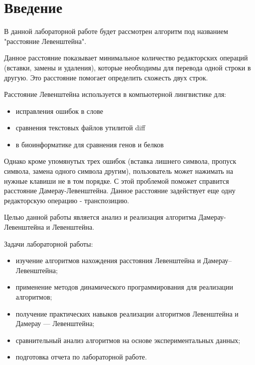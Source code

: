 \chapter*{Введение}

В данной лабораторной работе будет рассмотрен алгоритм под названием "расстояние Левенштейна". 

Данное расстояние показывает минимальное количество редакторских операций (вставки, замены и удаления), которые необходимы для перевода одной строки в другую. Это расстояние помогает определить схожесть двух строк.  

Расстояние Левенштейна используется в компьютерной лингвистике для:
\begin{itemize}
	\item исправления ошибок в слове
	\item сравнения текстовых файлов утилитой diff
	\item в биоинформатике для сравнения генов и белков
\end{itemize}

Однако кроме упомянутых трех ошибок (вставка лишнего символа, пропуск символа, замена одного символа другим), пользователь может нажимать на нужные клавиши не в том порядке. С этой проблемой поможет справится расстояние Дамерау-Левенштейна. Данное расстояние задействует еще одну редакторскую операцию - транспозицию.

Целью данной работы является анализ и реализация алгоритма Дамерау-Левенштейна и Левенштейна.  
\newline


Задачи лабораторной работы:
\begin{itemize}
    \item изучение алгоритмов нахождения расстояния Левенштейна и Дамерау--Левенштейна;
	\item применение методов динамического программирования для реализации алгоритмов;
	\item получение практических навыков реализации алгоритмов Левенштейна и Дамерау — Левенштейна;
	\item сравнительный анализ алгоритмов на основе экспериментальных данных;
	\item подготовка отчета по лабораторной работе.
\end{itemize}

